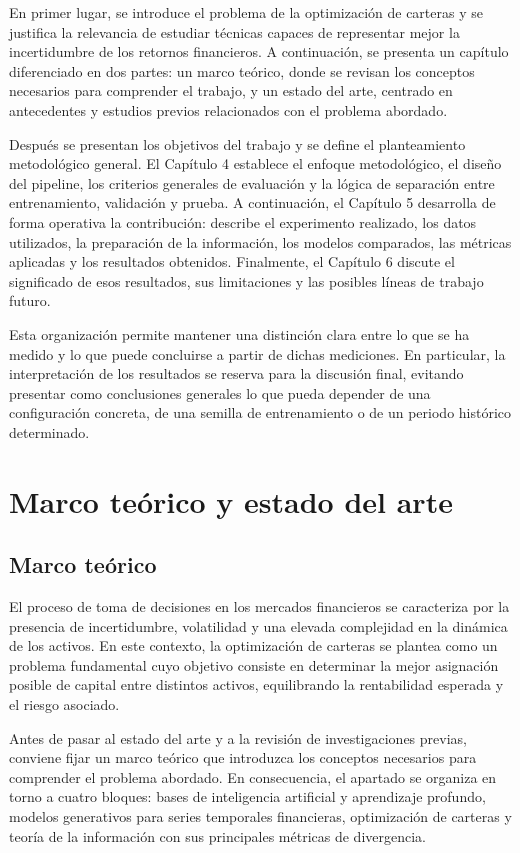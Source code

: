 \documentclass[11pt,a4paper,spanish,oneside]{book}
\numberwithin{equation}{chapter}
\numberwithin{figure}{chapter}
\begin{document}
En primer lugar, se introduce el problema de la optimización de carteras y se justifica la relevancia de estudiar técnicas capaces de representar mejor la incertidumbre de los retornos financieros. A continuación, se presenta un capítulo diferenciado en dos partes: un marco teórico, donde se revisan los conceptos necesarios para comprender el trabajo, y un estado del arte, centrado en antecedentes y estudios previos relacionados con el problema abordado.

Después se presentan los objetivos del trabajo y se define el planteamiento metodológico general. El Capítulo 4 establece el enfoque metodológico, el diseño del pipeline, los criterios generales de evaluación y la lógica de separación entre entrenamiento, validación y prueba. A continuación, el Capítulo 5 desarrolla de forma operativa la contribución: describe el experimento realizado, los datos utilizados, la preparación de la información, los modelos comparados, las métricas aplicadas y los resultados obtenidos. Finalmente, el Capítulo 6 discute el significado de esos resultados, sus limitaciones y las posibles líneas de trabajo futuro.

Esta organización permite mantener una distinción clara entre lo que se ha medido y lo que puede concluirse a partir de dichas mediciones. En particular, la interpretación de los resultados se reserva para la discusión final, evitando presentar como conclusiones generales lo que pueda depender de una configuración concreta, de una semilla de entrenamiento o de un periodo histórico determinado.


\chapter{Marco teórico y estado del arte}

\section{Marco teórico}
El proceso de toma de decisiones en los mercados financieros se caracteriza por la presencia de incertidumbre, volatilidad y una elevada complejidad en la dinámica de los activos. En este contexto, la optimización de carteras se plantea como un problema fundamental cuyo objetivo consiste en determinar la mejor asignación posible de capital entre distintos activos, equilibrando la rentabilidad esperada y el riesgo asociado.

Antes de pasar al estado del arte y a la revisión de investigaciones previas, conviene fijar un marco teórico que introduzca los conceptos necesarios para comprender el problema abordado. En consecuencia, el apartado se organiza en torno a cuatro bloques: bases de inteligencia artificial y aprendizaje profundo, modelos generativos para series temporales financieras, optimización de carteras y teoría de la información con sus principales métricas de divergencia.
\end{document}
